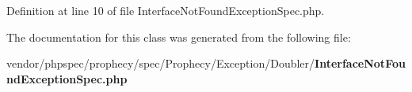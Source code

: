 Definition at line 10 of file Interface\+Not\+Found\+Exception\+Spec.\+php.



The documentation for this class was generated from the following file\+:\begin{DoxyCompactItemize}
\item 
vendor/phpspec/prophecy/spec/\+Prophecy/\+Exception/\+Doubler/{\bf Interface\+Not\+Found\+Exception\+Spec.\+php}\end{DoxyCompactItemize}

